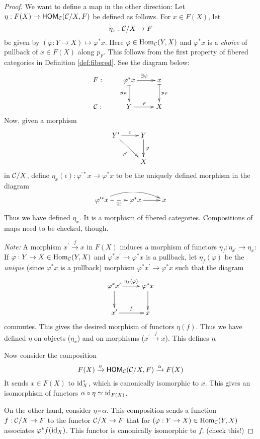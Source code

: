 \documentclass[11pt, english]{article}
\begin{document}
\begin{proof}
We want to define a map in the other direction: Let $\eta:F(X) \to \operatorname{\mathsf{HOM}}_{\mathcal{C}}(\mathcal{C}/X,F)$ be defined as follows. For $x \in F(X)$, let
\[
\eta_x:\mathcal{C}/X \to F
\]
be given by $(\varphi:Y \to X) \mapsto \varphi^\ast x$. Here $\varphi \in \operatorname{Hom}_{\mathcal{C}}(Y,X)$ and $\varphi^\ast x$ is a \emph{choice} of pullback of $x \in F(X)$ along $p_F$. This follows from the first property of fibered categories in Definition \ref{def:fibered}. See the diagram below:
\[
\xymatrix{
F: & \varphi^\ast x \ar[r]^{\exists \psi} \ar@{|->}[d]_{p_F} & x \ar@{|->}[d]^{p_F}\\
\CC: & Y \ar[r]^\varphi  & X
}
\]
Now, given a morphism
\[
\xymatrix{
\ar[dr]_{\varphi^\prime} Y^\prime \ar[r]^\epsilon & Y \ar[d]^\varphi \\
& X
}
\]
in $\mathcal{C}/X$, define $\eta_x(\epsilon):\varphi^{\prime \ast} x \to \varphi^\ast x$ to be the uniquely defined morphism in the diagram
\[
\xymatrix{
\ar@/^1pc/[rr] \varphi^{\prime \ast} x \ar@{-->}[r]_{\exists !} & \varphi^\ast x \ar[r] & x
}
\]
Thus we have defined $\eta_x$. It is a morphism of fibered categories. Compositions of maps need to be checked, though.

\emph{Note:} A morphism $x^\prime \xrightarrow{f} x$ in $F(X)$ induces a morphism of functors $\eta_f:\eta_{x^\prime} \to \eta_x$: If $\varphi:Y \to X \in \operatorname{Hom}_{\mathcal{C}}(Y,X)$ and $\varphi^\ast x^\prime \to \varphi^\ast x$ is a pullback, let $\eta_f(\varphi)$ be the \emph{unique} (since $\varphi^\ast x$ is a pullback) morphism $\varphi^\ast x^\prime \to \varphi^\ast x$ such that the diagram
\[
\xymatrix{
\varphi^\ast x^\prime \ar[d] \ar[r]^{\eta_f(\varphi)} & \varphi^\ast x \ar[d] \\
x^\prime \ar[r]^f & x  
}
\]
commutes. This gives the desired morphism of functors $\eta(f)$. Thus we have defined $\eta$ on objects ($\eta_x$) and on morphisms ($x^\prime \xrightarrow{f} x$). This defines $\eta$.

Now consider the composition
\[
F(X) \xrightarrow{\eta} \operatorname{\mathsf{HOM}}_{\mathcal{C}}(\mathcal{C}/X, F) \xrightarrow{\alpha} F(X)
\]
It sends $x \in F(X)$ to $\text{id}_X^\ast$, which is canonically isomorphic to $x$. This gives an isomorphism of functors $\alpha \circ \eta \simeq \text{id}_{F(X)}$. 

On the other hand, consider $\eta \circ \alpha$. This composition sends a function $f:\mathcal{C}/X \to F$ to the functor $\mathcal{C}/X \to F$ that for $(\varphi:Y \to X) \in \operatorname{Hom}_{\mathcal{C}}(Y,X)$ associates $\varphi^\ast f(\text{id}_X)$. This functor is canonically isomorphic to $f$. (check this!) 
\end{proof}
\end{document}
